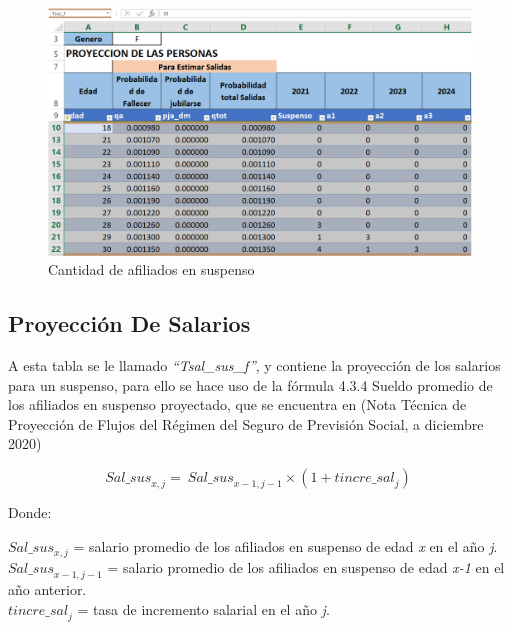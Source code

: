 \documentclass[
  letterpaper,
  DIV=11,
  numbers=noendperiod]{scrreprt}
\begin{document}
\begin{figure}

{\centering \includegraphics{images/F/Img22.png}

}

\caption{Cantidad de afiliados en suspenso}

\end{figure}

\hypertarget{proyecciuxf3n-de-salarios-1}{%
\subsection{Proyección De Salarios}\label{proyecciuxf3n-de-salarios-1}}

A esta tabla se le llamado \emph{``Tsal\_sus\_f''}, y contiene la
proyección de los salarios para un suspenso, para ello se hace uso de la
fórmula 4.3.4 Sueldo promedio de los afiliados en suspenso proyectado,
que se encuentra en (Nota Técnica de Proyección de Flujos del Régimen
del Seguro de Previsión Social, a diciembre 2020)

\begin{equation}
{Sal\_sus}_{x,j}=\ {Sal\_sus}_{x-1,j-1}\times(1+{tincre\_sal}_j)\ \end{equation}

Donde:

\({Sal\_sus}_{x,j}\) = salario promedio de los afiliados en suspenso de
edad \emph{x} en el año \emph{j}.\\
\({Sal\_sus}_{x-1,j-1}\) = salario promedio de los afiliados en suspenso
de edad \emph{x-1} en el año anterior.\\
\({tincre\_sal}_j\) = tasa de incremento salarial en el año \emph{j}.
\end{document}
